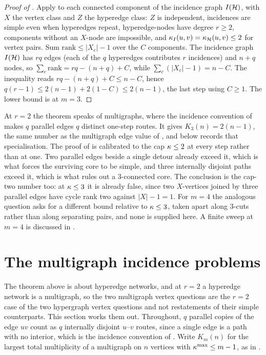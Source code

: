 \begin{proof}[Proof of ]
Apply  to each connected component of the incidence
graph $I(\mathcal{H})$, with $X$ the vertex class and $Z$ the hyperedge class:
$Z$ is independent, incidences are simple even when hyperedges repeat,
hyperedge-nodes have degree $r \ge 2$, components without an $X$-node are
impossible, and $\kappa_{I}(u, v) = \kappa_{\mathcal{H}}(u, v) \le 2$ for vertex pairs.
Sum $\mathrm{rank} \le |X_c| - 1$ over the $C$ components. The incidence graph
$I(\mathcal{H})$ has $rq$ edges (each of the $q$ hyperedges contributes $r$ incidences)
and $n + q$ nodes, so $\sum_c \mathrm{rank} = rq - (n + q) + C$, while
$\sum_c (|X_c| - 1) = n - C$. The inequality reads $rq - (n + q) + C \le n - C$,
hence $q(r-1) \le 2(n-1) + 2(1 - C) \le 2(n-1)$, the last step using $C \ge 1$.
The lower bound is  at $m = 3$.
\end{proof}

\begin{remark}[Edges as gates at $r = 2$, and the boundary of the method]
\label{rem:hyper-vertex-m3-scope}
At $r = 2$ the theorem speaks of multigraphs, where the incidence convention
of  makes $q$ parallel edges $q$ distinct one-step
routes. It gives $K_3(n) = 2(n-1)$, the same number as the multigraph edge
value of , and  below records
that specialisation. The proof of
 is calibrated to the cap $\kappa \le 2$ at every step
rather than at one. Two parallel edges beside a single detour already exceed
it, which is what forces the surviving core to be simple, and three internally
disjoint paths exceed it, which is what rules out a $3$-connected core. The
conclusion is the cap-two number too: at $\kappa \le 3$ it is already false,
since two $X$-vertices joined by three parallel edges have cycle rank two
against $|X| - 1 = 1$. For $m = 4$ the analogous question asks for a different
bound relative to $\kappa \le 3$, taken apart along $3$-cuts rather than along
separating pairs, and none is supplied here.
A finite sweep at $m=4$ is discussed in .
\end{remark}

\section{The multigraph incidence problems}\label{sec:multi-vertex}

The theorem above is about hyperedge networks, and at $r = 2$ a hyperedge network is a multigraph, so the two multigraph vertex questions are the $r = 2$ case of the two hypergraph vertex questions and not restatements of their simple counterparts. This section works them out. Throughout, $q$ parallel copies of the edge $uv$ count as $q$ internally disjoint $u$--$v$ routes, since a single edge is a path with no interior, which is the incidence convention of . Write $K_m(n)$ for the largest total multiplicity of a multigraph on $n$ vertices with $\kappa^{\max} \le m-1$, as in .

